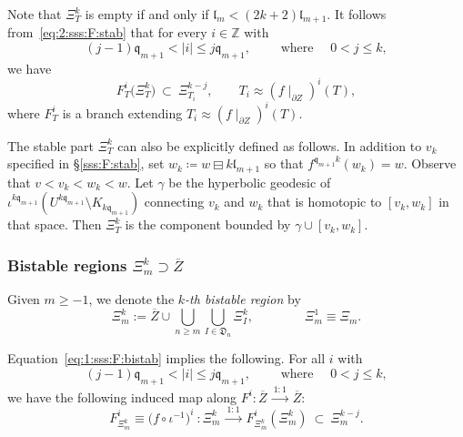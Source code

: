 \documentclass{amsart}
\newcommand{\1}{{\mathbb 1 }}
\newcommand{\qq}{\mathfrak{q}}
\newcommand{\length}{{\mathfrak l}}
\newcommand{\Z}{\mathbb{Z}}
\newcommand{\Dbb}{{\mathfrak{D}}}
\theoremstyle{remark}
\numberwithin{equation}{section}
\theoremstyle{definition}
\begin{document}
Note that $ \Xi^k_T$ is empty if and only if $\length_{m}<(2k+2)\length_{m+1}$. It follows from~\eqref{eq:2:sss:F:stab} that for every $i\in \Z$ with 
\[(j-1)\qq_{m+1}< |i|\le j \qq_{m+1},\qquad \text{ where }\quad 0< j\le k,\]
we have 
\begin{equation}\label{eq:1:sss:F:bistab}
 F^{i}_T \Big(\Xi^k_T\Big)\ \subset \  \Xi^{k-j}_{T_i},\qquad T_{i} \approx (f\mid_{\partial Z}) ^{i}(T),
\end{equation}
where $ F^{i}_T$ is a branch extending $T_{i} \approx (f\mid_{\partial Z}) ^{i}(T)$.


The stable part  $\Xi_T^k$ can also be explicitly defined as follows. In addition to $v_k$ specified in \S\ref{sss:F:stab}, set $w_k \coloneqq w\boxminus k \length_{m+1}$ so that $f^{\qq_{m+1}k}(w_k)=w$. Observe that $v< v_k<w_k<w$. Let $\gamma$ be the hyperbolic geodesic of $\iota^{k\qq_{m+1}}( U^{k\qq_{m+1}}\setminus K_{k\qq_{m+1}})$ connecting $v_k$ and $w_k$ that is homotopic to $[v_k,w_k]$ in that space. Then $\Xi^k_T$ is the component bounded by $\gamma \cup [v_k,w_k]$.



\subsubsection{Bistable regions $\Xi_m^k \supset \overline Z$}\label{sss:biXi} Given $m\ge -1$, we denote the {\em $k$-th bistable region} by
$$
\Xi^k_m:= \overline Z \cup \bigcup_{n \geq m}\bigcup_{I \in \Dbb_n} \Xi^k_I,\qquad\qquad \Xi^1_m\equiv \Xi_m.
$$


Equation~\eqref{eq:1:sss:F:bistab} implies the following. For all $i$ with \[(j-1)\qq_{m+1}< |i|\le j \qq_{m+1},\qquad \text{ where }\quad 0< j\le k,\] we have the following induced map along $F^{i}\colon \overline Z \ \overset {1:1}{\longrightarrow}\   \overline Z$:
\begin{equation}
    \label{eq:F_biXi} F^{i}_{\Xi_m^k}\equiv \big(f \circ \iota^{-1}\big)^{i}\ \colon \Xi^k_{m} \ \overset {1:1}{\longrightarrow}\  F^{i}_{\Xi_m^k}(\Xi_m^k) \ \subset \ \Xi_m^{k-j}. 
\end{equation}
\end{document}

